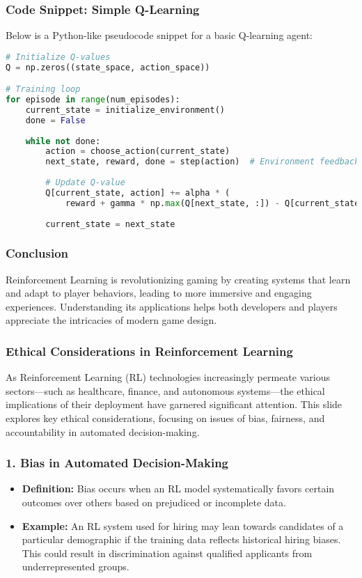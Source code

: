 \documentclass{beamer}
\begin{document}
\begin{frame}[fragile]
    \frametitle{Code Snippet: Simple Q-Learning}
    Below is a Python-like pseudocode snippet for a basic Q-learning agent:
    \begin{lstlisting}[language=Python]
# Initialize Q-values
Q = np.zeros((state_space, action_space))

# Training loop
for episode in range(num_episodes):
    current_state = initialize_environment()
    done = False
    
    while not done:
        action = choose_action(current_state)
        next_state, reward, done = step(action)  # Environment feedback
        
        # Update Q-value
        Q[current_state, action] += alpha * (
            reward + gamma * np.max(Q[next_state, :]) - Q[current_state, action])
        
        current_state = next_state
    \end{lstlisting}
\end{frame}

\begin{frame}
    \frametitle{Conclusion}
    Reinforcement Learning is revolutionizing gaming by creating systems that learn and adapt to player behaviors, leading to more immersive and engaging experiences. Understanding its applications helps both developers and players appreciate the intricacies of modern game design.
\end{frame}

\begin{frame}[fragile]
    \frametitle{Ethical Considerations in Reinforcement Learning}
    As Reinforcement Learning (RL) technologies increasingly permeate various sectors—such as healthcare, finance, and autonomous systems—the ethical implications of their deployment have garnered significant attention. This slide explores key ethical considerations, focusing on issues of bias, fairness, and accountability in automated decision-making.
\end{frame}

\begin{frame}[fragile]
    \frametitle{1. Bias in Automated Decision-Making}
    \begin{itemize}
        \item \textbf{Definition:} Bias occurs when an RL model systematically favors certain outcomes over others based on prejudiced or incomplete data.
        \item \textbf{Example:} An RL system used for hiring may lean towards candidates of a particular demographic if the training data reflects historical hiring biases. This could result in discrimination against qualified applicants from underrepresented groups.
    \end{itemize}
\end{frame}
\end{document}

